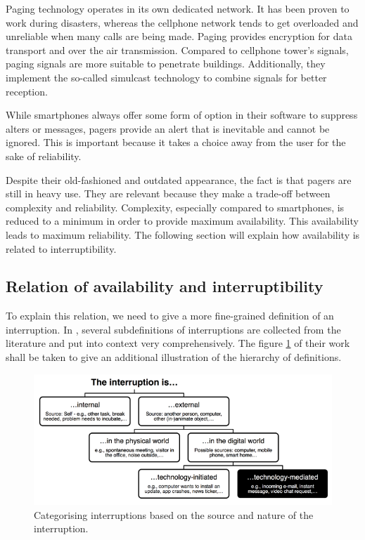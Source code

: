 \documentclass{CML_Seminar_Template}
\begin{document}
Paging technology operates in its own dedicated network. It has been proven to work during disasters, whereas the cellphone network tends to get overloaded and unreliable when many calls are being made. Paging provides encryption for data transport and over the air transmission. Compared to cellphone tower's signals, paging signals are more suitable to penetrate buildings. Additionally, they implement the so-called simulcast technology to combine signals for better reception.
\par
While smartphones always offer some form of option in their software to suppress alters or messages, pagers provide an alert that is inevitable and cannot be ignored. This is important because it takes a choice away from the user for the sake of reliability.
\par
Despite their old-fashioned and outdated appearance, the fact is that pagers are still in heavy use. They are relevant because they make a trade-off between complexity and reliability. Complexity, especially compared to smartphones, is reduced to a minimum in order to provide maximum availability. This availability leads to maximum reliability. The following section will explain how availability is related to interruptibility.

\subsection{Relation of availability and interruptibility}
To explain this relation, we need to give a more fine-grained definition of an interruption. In \cite[]{Fetter2018}, several subdefinitions of interruptions are collected from the literature and put into context very comprehensively. The figure \ref{interruptions_fig} of their work shall be taken to give an additional illustration of the hierarchy of definitions.

\begin{figure}[htb]
  \begin{center}
   \includegraphics{interruption_definition_small.PNG}
  \end{center}
    \caption{\label{interruptions_fig}  Categorising interruptions based on the source and nature of the interruption. \cite[]{Fetter2018}}
\end{figure}
\end{document}
